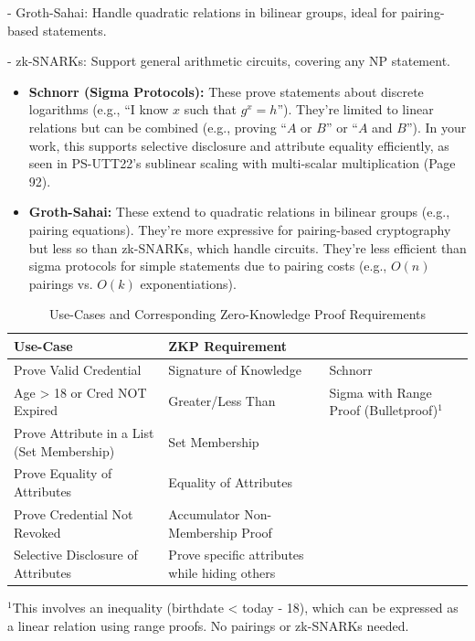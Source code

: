 - Groth-Sahai: Handle quadratic relations in bilinear groups, ideal for pairing-based statements.

- zk-SNARKs: Support general arithmetic circuits, covering any NP statement.

\begin{itemize}
\item \textbf{Schnorr (Sigma Protocols):} These prove statements about discrete logarithms (e.g., ``I know $x$ such that $g^x = h$''). They're limited to linear relations but can be combined (e.g., proving ``$A$ or $B$'' or ``$A$ and $B$''). In your work, this supports selective disclosure and attribute equality efficiently, as seen in PS-UTT22's sublinear scaling with multi-scalar multiplication (Page 92).

\item \textbf{Groth-Sahai:} These extend to quadratic relations in bilinear groups (e.g., pairing equations). They're more expressive for pairing-based cryptography but less so than zk-SNARKs, which handle circuits. They're less efficient than sigma protocols for simple statements due to pairing costs (e.g., $O(n)$ pairings vs. $O(k)$ exponentiations).
\end{itemize}


\begin{table}[h]
    \centering
    \begin{tabular}{|l|l||l}
        \hline
        \textbf{Use-Case} & \textbf{ZKP Requirement} \\
        \hline
        Prove Valid Credential 
        & 
        Signature of Knowledge 
        &
        Schnorr
        \\
        \hline
        Age > 18 or Cred NOT Expired 
        & 
        Greater/Less Than 
        &
        Sigma with Range Proof (Bulletproof)$^1$
        \\
        \hline
        Prove Attribute in a List (Set Membership) 
        & 
        Set Membership\\
        \hline
        Prove Equality of Attributes 
        & 
        Equality of Attributes \\
        \hline
        Prove Credential Not Revoked 
        & 
        Accumulator Non-Membership Proof \\
        \hline
        Selective Disclosure of Attributes 
        & 
        Prove specific attributes while hiding others \\
        \hline
    \end{tabular}
    \caption{Use-Cases and Corresponding Zero-Knowledge Proof Requirements}
    \label{tab:use_cases_zkp}
    \footnotesize{$^1$This involves an inequality (birthdate < today - 18), which can be expressed as a linear relation using range proofs. No pairings or zk-SNARKs needed.}
\end{table}


